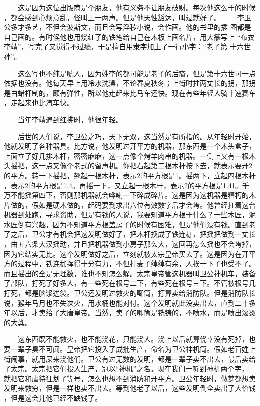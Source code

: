　　这是因为这位出版商是个朋友，他有义务不让朋友破财。每次他这么干的时候 ，都会感到心烦意乱，怪叫上一两声。但是他天性豁达，叫过就好了。 　　李卫公多才多艺，不但会波斯文，而且会写淫秽小说，会作画。他的书里的插 图都是自己画的。有时候他也用烧红了的铁笔给自己在木板上画名片，用大篆写上 “布衣李靖”，写完了又觉得不过瘾，于是擅自用隶字加上了一行小字：“老子第 十六世孙”。

 　　这么写也不纯是唬人，因为姓李的都可能是老子的后裔，但是第十六世可一点 依据也没有。他每天早上用冷水洗澡，不论春夏秋冬；上街时拄两丈长的拐，那拐 是白蜡杆制的，颇有弹性，所以他走起来比马车还快。现在有些年轻人骑十速赛车 ，走起来也比汽车快。

 　　当年李靖遇到红拂时，他很年轻。

 　　后世的人们说，李卫公之巧，天下无双，这当然是有所指的。从年轻时开始， 他就发明了各种器具。比方说，他发明过开平方的机器，那东西是一个木头盒子， 上面立了好几排木杆，密密麻麻，这一点像个烤羊肉串的机器。一侧上又有一根木 头摇把，这一点又像个老式的留声机。你把右起第二根木杆按下去，就表示要开2 的平方。转一下摇把，翘起一根木杆，表示2的平方根是1。摇两下，立起四根木杆 ，表示2的平方根是1.4。再摇一下，又立起一根木杆，表示2的平方根是1.41。千 万不能摇第四下，否则那机器就会哗喇一下碎成碎片。这是因为这机器是糟朽的木 片做的，假如是硬木做的，起码要到求出六位有效数字后才会垮。他曾经扛着这台 机器到处跑，寻求资助，但是有钱的人说，我要知道平方根干什么？一些木匠，泥 水匠倒有兴趣，因为不知道平方根盖房子的时候有困难，但是他们没有钱。直到老 了之后，卫公才有机会把这发明做好了，把木杆换成了铁连枷，把摇把做到一丈长 ，由五六条大汉摇动，并且把机器做到小房子那么大，这回再怎么摇也不会垮掉， 因为它结实无比。这个发明做好之后，立刻就被太宗皇帝买去了。这是因为在开平 方的过程中，铁连枷挥得十分有力，不但打麦子绰绰有余，人挨一下子也受不了。 而且摇出的全是无理数，谁也不知怎么躲。太宗皇帝管这机器叫卫公神机车，装备 了部队，打死了好多人，有一些死在根号二下，有些死在根号三下。不管被根号几 打死，都是脑浆迸裂。卫公还发明过救火的唧筒，打算卖给消防队。但是消防队长 说，猴年马月也不失次火，用水桶也能对付。这个发明就此没卖出去，直到二十多 年以后，才卖给了大唐皇帝。当然，卖了的唧筒是铣铸的，不喷水，而是喷出滚烫 的大粪。 

　　这东西既不能救火，也不能浇花，只能浇人。浇上以后就算侥幸没有死掉，也 要一辈子臭不可闻。皇帝把它投入了成批生产，命名为卫公神机筒。假如老百姓上 街闹事，就用屎来浇他们。卫公有过无数的发明，都是一辈子卖不出去，最后卖给 了太宗。太宗把它们投入生产，冠以“神机”之名。现在我们一听到神机两个字， 就把它和虐待狂划了等号，怎么也想不到消防和开平方。卫公年轻时，做梦都想卖 发明来救穷，但是一样也卖不出去。等到他老了以后，这些发明倒全卖出了大价钱 ，但是这会儿他已经不缺钱了。

